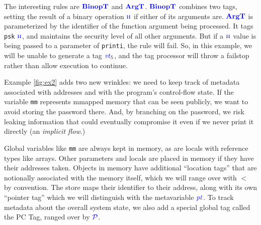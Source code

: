 \documentclass{llncs}
\begin{document}
The interesting rules are \(\color{blue} \mathbf{BinopT}\) and \(\color{blue} \mathbf{ArgT}\). \(\color{blue} \mathbf{BinopT}\)
combines two tags, setting the result of a binary operation \(\textnormal{\color{blue} \sc h}\) if either of its arguments are.
\(\color{blue} \mathbf{ArgT}\) is parameterized by the identifier of the function argument being processed.
It tags {\tt psk} \(\textnormal{\color{blue} \sc h}\), and maintains the security level of all other arguments.
But if a \(\textnormal{\color{blue} \sc h}\) value is being passed to a parameter of {\tt printi}, the rule will fail.
So, in this example, we will be unable to generate a tag
\(\mathit{\color{blue} vt}_5\), and the tag processor will throw a failstop rather than allow execution to continue.

Example \ref{fig:ex2} adds two new wrinkles: we need to keep track of metadata associated with
addresses and with the program's control-flow state. If the variable {\tt mm} represents
mmapped memory that can be seen publicly, we want to avoid storing the password there. And, by
branching on the password, we risk leaking information that could eventually compromise it even
if we never print it directly (an {\em implicit flow}.)

Global variables like {\tt mm} are always kept in memory, as are locals with reference types like arrays.
Other parameters and locals are placed in memory if they have their addresses taken.
Objects in memory have additional ``location tags'' that are notionally associated with the memory
itself, which we will range over with \(\lt\) by convention. The store maps their identifier
to their address, along with its own ``pointer tag'' which we will distinguish with the
metavariable \(\mathit{\color{blue} pt}\). To track metadata about the overall system state, we also add
a special global tag called the PC Tag, ranged over by \(\mathcal{\color{blue} P}\).
\end{document}
